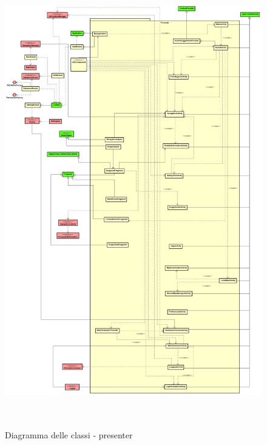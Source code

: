 \documentclass[../DefinizioneDiProdotto.tex,lanscape]{subfiles}
\begin{document}
\begin{figure}[H]
	\includegraphics[width=\textwidth, height=19cm]{diagrams/ModelCompleteNoMethods/PNGpackage/presenter}
	\label{presenterPackage}
	\caption{Diagramma delle classi - presenter}
\end{figure}
\end{document}
